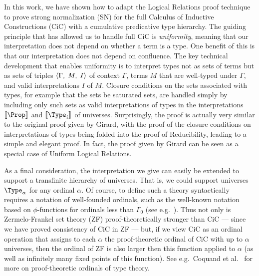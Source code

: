\documentclass{article}
\begin{document}
In this work, we have shown how to adapt the Logical Relations proof
technique to prove strong normalization (SN) for the full Calculus of
Inductive Constructions (CiC) with a cumulative predicative type
hierarchy. The guiding principle that has allowed us to handle full
CiC is \emph{uniformity}, meaning that our interpretation does not
depend on whether a term is a type. One benefit of this is that our
interpretation does not depend on confluence.  The key technical
development that enables uniformity is to interpret types not as sets
of terms but as sets of triples $\langle \Gamma ,\; M, \; I\rangle$ of context $\Gamma$,
terms $M$ that are well-typed under $\Gamma$, and valid
interpretations $I$ of $M$. Closure conditions on the sets associated
with types, for example that the sets be saturated sets, are handled
simply by including only such sets as valid interpretations of types
in the interpretations $\interpnod{\Prop}$ and $\interpnod{\Type_i}$ of
universes. Surprisingly, the proof is actually very similar to the
original proof given by Girard, with the proof of the closure
conditions on interpretations of types being folded into the proof of
Reducibility, leading to a simple and elegant proof.  In fact, the
proof given by Girard can be seen as a special case of Uniform Logical
Relations.


As a final consideration, the interpretation we give can easily be
extended to support a transfinite hierarchy of universes.  That is, we
could support universes $\Type_{\alpha}$ for any ordinal $\alpha$. Of
course, to define such a theory syntactically requires a notation of
well-founded ordinals, such as the well-known notation based on
$\phi$-functions for ordinals less than $\Gamma_0$ (see
e.g.~\cite{gallier91}). Thus not only is Zermelo-Frankel set theory
(ZF) proof-theoretically stronger than CiC --- since we have proved
consistency of CiC in ZF --- but, if we view CiC as an
ordinal operation that assigns to each $\alpha$ the proof-theoretic
ordinal of CiC with up to $\alpha$ universes, then the ordinal of ZF
is also larger then this function applied to $\alpha$ (as well as
infinitely many fixed points of this function).
See e.g.\ Coquand
et al.\ \cite{coquand97} for more on proof-theoretic ordinals of type
theory.
\end{document}
